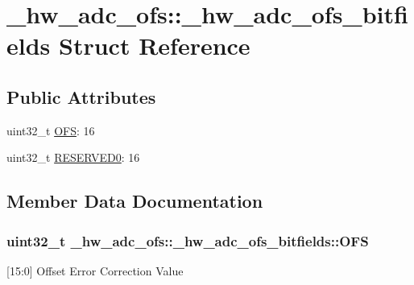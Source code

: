 \hypertarget{struct__hw__adc__ofs_1_1__hw__adc__ofs__bitfields}{}\section{\+\_\+hw\+\_\+adc\+\_\+ofs\+:\+:\+\_\+hw\+\_\+adc\+\_\+ofs\+\_\+bitfields Struct Reference}
\label{struct__hw__adc__ofs_1_1__hw__adc__ofs__bitfields}
\subsection*{Public Attributes}
\begin{DoxyCompactItemize}
\item 
uint32\+\_\+t \hyperlink{struct__hw__adc__ofs_1_1__hw__adc__ofs__bitfields_af4a1295133f0086198a84b71ab525435}{O\+FS}\+: 16
\item 
uint32\+\_\+t \hyperlink{struct__hw__adc__ofs_1_1__hw__adc__ofs__bitfields_a848c44c4c6a0a74a8a58510e316b0282}{R\+E\+S\+E\+R\+V\+E\+D0}\+: 16
\end{DoxyCompactItemize}


\subsection{Member Data Documentation}
\subsubsection[{\texorpdfstring{O\+FS}{OFS}}]{\setlength{\rightskip}{0pt plus 5cm}uint32\+\_\+t \+\_\+hw\+\_\+adc\+\_\+ofs\+::\+\_\+hw\+\_\+adc\+\_\+ofs\+\_\+bitfields\+::\+O\+FS}\hypertarget{struct__hw__adc__ofs_1_1__hw__adc__ofs__bitfields_af4a1295133f0086198a84b71ab525435}{}\label{struct__hw__adc__ofs_1_1__hw__adc__ofs__bitfields_af4a1295133f0086198a84b71ab525435}
\mbox{[}15\+:0\mbox{]} Offset Error Correction Value 
